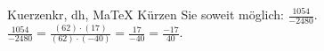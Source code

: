 \begin{MAufgabe}{Kuerzen}{kr, dh, MaTeX}
K\"urzen Sie soweit m\"oglich: $\frac{1054}{-2480}$.\\ 
\ifLsg\MLoesung
\quad $\frac{1054}{-2480}=\frac{(62)\cdot(17)}{(62)\cdot(-40)}=\frac{17}{-40}=\frac{-17}{40}$.\else\relax\fi
 \end{MAufgabe}